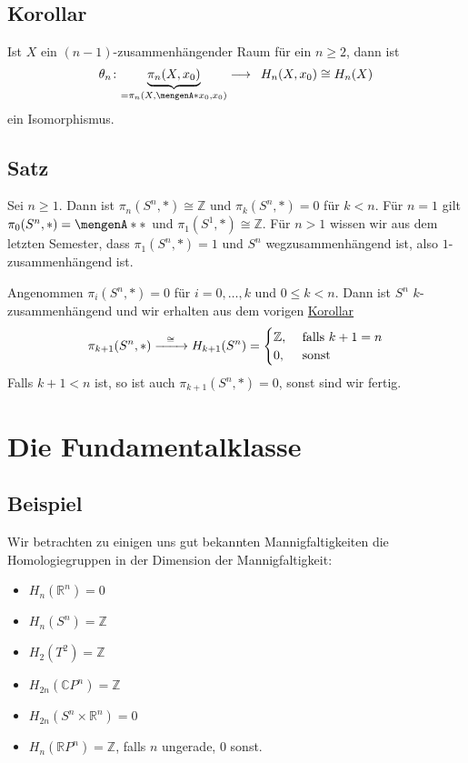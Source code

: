 \subsection[Korollar: Isomorphie von Homotopie-- und Homologiegruppen für $(n-1)$-zsmhg. Räume]{Korollar} %
\label{sub:1524}
Ist $X$ ein $(n-1)$-zusammenhängender Raum für ein $n \ge 2$, dann ist 
\[
	\theta_n \colon \Underbrace{\pi_n(X,x_0)}{=\pi_n(X,\set{x_0},x_0)} \longrightarrow \enspace H_n(X,x_0)\cong H_n(X)
\]
ein Isomorphismus.

\subsection[Satz über höhere Homotopiegruppen der Sphäre]{Satz} %
\label{sub:1525}
Sei $n \ge 1$. Dann ist $\pi_n(S^n,*)\cong \mathds{Z}$ und $\pi_k(S^n,*)=0$ für $k <n$.
Für $n=1$ gilt $\pi_0(S^n,*)= \set{*}$ und $\pi_1(S^1,*)\cong \mathds{Z}$. Für $n>1$ wissen wir aus dem letzten Semester, dass $\pi_1(S^n,*)=1$ und $S^n$ wegzusammenhängend ist, also 
$1$-zusammenhängend ist.

Angenommen $\pi_i(S^n,*)=0$ für $i=0,\ldots ,k$ und $0 \le k < n$. Dann ist $S^n$ $k$-zusammenhängend und wir erhalten aus dem vorigen \hyperref[sub:1524]{Korollar}
\[
	\pi_{k+1}(S^n,*) \xrightarrow{\minwidthbox{\cong}{2em}} H_{k+1}(S^n)= \begin{cases}
		\mathds{Z}, &\text{ falls }k+1=n\\
		0 , &\text{ sonst}
	\end{cases}
\]
Falls $k+1<n$ ist, so ist auch $\pi_{k+1}(S^n,*)=0$, sonst sind wir fertig. \bewende
\newpage
\section{Die Fundamentalklasse} %
\label{sec:16}
\subsection[Beispiele für die Homologiegruppen verschiedener Mannigfaltigkeiten]{Beispiel} %
\label{sub:161}
Wir betrachten zu einigen uns gut bekannten Mannigfaltigkeiten die Homologiegruppen in der Dimension der Mannigfaltigkeit:
\begin{multicols}{2}
	\begin{itemize}
		\item $H_n(\mathds{R}^n)=0$
		\item $H_n(S^n)=\mathds{Z}$
		\item $H_2(T^2)=\mathds{Z}$
		\item $H_{2n}(\mathds{C}P^n)=\mathds{Z}$
		\item $H_{2n}(S^n \times \mathds{R}^n)=0$
		\item $H_n(\mathds{R}P^n)=\mathds{Z}$, falls $n$ ungerade, $0$ sonst.
	\end{itemize}
\end{multicols}

